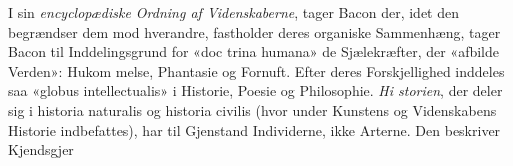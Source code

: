 \documentclass[12pt,a4paper]{book}
\begin{document}
I sin \emph{encyclopædiske Ordning af Videnskaberne}, tager Bacon
der, idet den begrændser dem mod hverandre, fastholder deres
organiske Sammenhæng, tager Bacon til Inddelingsgrund for «doc\-%
trina humana» de Sjælekræfter, der «afbilde Verden»: Hukom\-%
%
melse, Phantasie og Fornuft. Efter deres Forskjellighed inddeles
saa «globus intellectualis» i Historie, Poesie og Philosophie. \emph{Hi\-%
storien}, der deler sig i historia naturalis og historia civilis (hvor\-%
under Kunstens og Videnskabens Historie indbefattes), har til
Gjenstand Individerne, ikke Arterne. Den beskriver Kjendsgjer\-%
\end{document}
